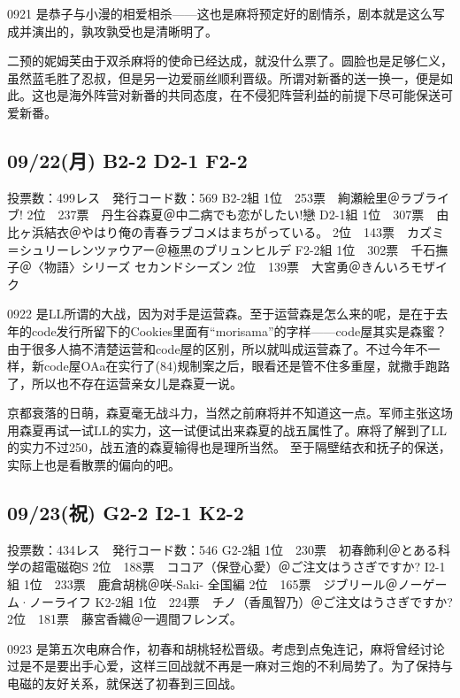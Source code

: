 0921 是恭子与小漫的相爱相杀——这也是麻将预定好的剧情杀，剧本就是这么写成并演出的，孰攻孰受也是清晰明了。

二预的妮姆芙由于双杀麻将的使命已经达成，就没什么票了。圆脸也是足够仁义，虽然蓝毛胜了忍叔，但是另一边爱丽丝顺利晋级。所谓对新番的送一换一，便是如此。这也是海外阵营对新番的共同态度，在不侵犯阵营利益的前提下尽可能保送可爱新番。

\subsection{09/22(月) B2-2 D2-1 F2-2}

    投票数：499レス　発行コード数：569
    B2-2組
    1位　253票　絢瀬絵里＠ラブライブ!
    2位　237票　丹生谷森夏＠中二病でも恋がしたい!戀
    D2-1組
    1位　307票　由比ヶ浜結衣＠やはり俺の青春ラブコメはまちがっている。
    2位　143票　カズミ＝シュリーレンツァウアー＠極黒のブリュンヒルデ
    F2-2組
    1位　302票　千石撫子＠〈物語〉シリーズ セカンドシーズン
    2位　139票　大宮勇＠きんいろモザイク

0922 是LL所谓的大战，因为对手是运营森。至于运营森是怎么来的呢，是在于去年的code发行所留下的Cookies里面有“morisama”的字样——code屋其实是森蜜？由于很多人搞不清楚运营和code屋的区别，所以就叫成运营森了。不过今年不一样，新code屋OAa在实行了(84)规制案之后，眼看还是管不住多重屋，就撒手跑路了，所以也不存在运营亲女儿是森夏一说。

京都衰落的日萌，森夏毫无战斗力，当然之前麻将并不知道这一点。军师主张这场用森夏再试一试LL的实力，这一试便试出来森夏的战五属性了。麻将了解到了LL的实力不过250，战五渣的森夏输得也是理所当然。
至于隔壁结衣和抚子的保送，实际上也是看散票的偏向的吧。

\subsection{09/23(祝) G2-2 I2-1 K2-2}

    投票数：434レス　発行コード数：546
    G2-2組
    1位　230票　初春飾利＠とある科学の超電磁砲S
    2位　188票　ココア（保登心愛）＠ご注文はうさぎですか?
    I2-1組
    1位　233票　鹿倉胡桃＠咲-Saki- 全国編
    2位　165票　ジブリール＠ノーゲーム·ノーライフ
    K2-2組
    1位　224票　チノ（香風智乃）＠ご注文はうさぎですか?
    2位　181票　藤宮香織＠一週間フレンズ。

0923 是第五次电麻合作，初春和胡桃轻松晋级。考虑到点兔连记，麻将曾经讨论过是不是要出手心爱，这样三回战就不再是一麻对三炮的不利局势了。为了保持与电磁的友好关系，就保送了初春到三回战。

